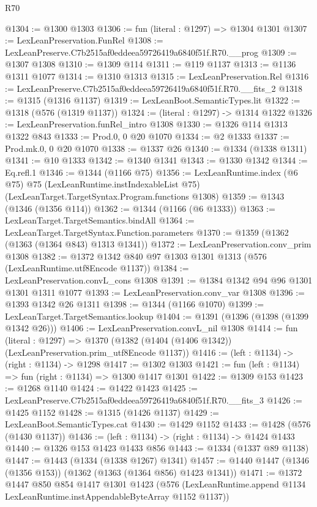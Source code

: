 \begin{lexlean}{R70}
\begin{coremodule}
@1304 := @1300 @1303
@1306 := fun (literal : @1297) => @1304 @1301
@1307 := LexLeanPreservation.FunRel
@1308 := LexLeanPreserve.C7b2515af0eddeea59726419a6840f51f.R70.__prog
@1309 := @1307 @1308
@1310 := @1309 @114
@1311 := @119 @1137
@1313 := @1136 @1311 @1077
@1314 := @1310 @1313
@1315 := LexLeanPreservation.Rel
@1316 := LexLeanPreserve.C7b2515af0eddeea59726419a6840f51f.R70.__fits_2
@1318 := @1315 (@1316 @1137)
@1319 := LexLeanBoot.SemanticTypes.lit
@1322 := @1318 (@576 (@1319 @1137))
@1324 := (literal : @1297) -> @1314 @1322
@1326 := LexLeanPreservation.funRel_intro @1308
@1330 := @1326 @114 @1313 @1322 @843
@1333 := Prod.{0, 0} @20 @1070
@1334 := @2 @1333
@1337 := Prod.mk.{0, 0} @20 @1070
@1338 := @1337 @26
@1340 := @1334 (@1338 @1311)
@1341 := @10 @1333
@1342 := @1340 @1341
@1343 := @1330 @1342
@1344 := Eq.refl.{1}
@1346 := @1344 (@1166 @75)
@1356 := LexLeanRuntime.index
    (@6 @75)
    @75
    (LexLeanRuntime.instIndexableList @75)
    (LexLeanTarget.TargetSyntax.Program.functions @1308)
@1359 := @1343 (@1346 (@1356 @114))
@1362 := @1344 (@1166 (@6 @1333))
@1363 := LexLeanTarget.TargetSemantics.bindAll
@1364 := LexLeanTarget.TargetSyntax.Function.parameters
@1370 := @1359 (@1362 (@1363 (@1364 @843) @1313 @1341))
@1372 := LexLeanPreservation.conv_prim @1308
@1382 := @1372 @1342 @840 @97 @1303 @1301 @1313 (@576 (LexLeanRuntime.utf8Encode @1137))
@1384 := LexLeanPreservation.convL_cons @1308
@1391 := @1384 @1342 @94 @96 @1301 @1301 @1311 @1077
@1393 := LexLeanPreservation.conv_var @1308
@1396 := @1393 @1342 @26 @1311
@1398 := @1344 (@1166 @1070)
@1399 := LexLeanTarget.TargetSemantics.lookup
@1404 := @1391 (@1396 (@1398 (@1399 @1342 @26)))
@1406 := LexLeanPreservation.convL_nil @1308
@1414 := fun (literal : @1297) =>
  @1370 (@1382 (@1404 (@1406 @1342)) (LexLeanPreservation.prim_utf8Encode @1137))
@1416 := (left : @1134) -> (right : @1134) -> @1298
@1417 := @1302 @1303
@1421 := fun (left : @1134) => fun (right : @1134) => @1300 @1417 @1301
@1422 := @1309 @153
@1423 := @1268 @1140
@1424 := @1422 @1423
@1425 := LexLeanPreserve.C7b2515af0eddeea59726419a6840f51f.R70.__fits_3
@1426 := @1425 @1152
@1428 := @1315 (@1426 @1137)
@1429 := LexLeanBoot.SemanticTypes.cat
@1430 := @1429 @1152
@1433 := @1428 (@576 (@1430 @1137))
@1436 := (left : @1134) -> (right : @1134) -> @1424 @1433
@1440 := @1326 @153 @1423 @1433 @856
@1443 := @1334 (@1337 @89 @1138)
@1447 := @1443 (@1334 (@1338 @1267) @1341)
@1457 := @1440 @1447 (@1346 (@1356 @153)) (@1362 (@1363 (@1364 @856) @1423 @1341))
@1471 := @1372
    @1447
    @850
    @854
    @1417
    @1301
    @1423
    (@576 (LexLeanRuntime.append @1134 LexLeanRuntime.instAppendableByteArray @1152 @1137))

\end{coremodule}
\end{lexlean}
